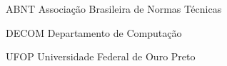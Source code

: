 \begin{siglas}
  \item[ABNT] Associação Brasileira de Normas Técnicas
  \item[DECOM] Departamento de Computação
	\item[UFOP] Universidade Federal de Ouro Preto
\end{siglas}